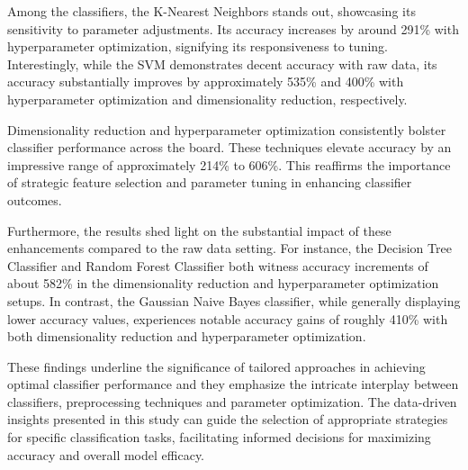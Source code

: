 \documentclass[conference,onecolumn]{IEEEtran}
\begin{document}
    Among the classifiers, the K-Nearest Neighbors stands out, showcasing its sensitivity to parameter adjustments. Its accuracy increases by around 291\% with hyperparameter optimization, signifying its responsiveness to tuning. Interestingly, while the SVM demonstrates decent accuracy with raw data, its accuracy substantially improves by approximately 535\% and 400\% with hyperparameter optimization and dimensionality reduction, respectively.

    Dimensionality reduction and hyperparameter optimization consistently bolster classifier performance across the board. These techniques elevate accuracy by an impressive range of approximately 214\% to 606\%. This reaffirms the importance of strategic feature selection and parameter tuning in enhancing classifier outcomes.

    Furthermore, the results shed light on the substantial impact of these enhancements compared to the raw data setting. For instance, the Decision Tree Classifier and Random Forest Classifier both witness accuracy increments of about 582\% in the dimensionality reduction and hyperparameter optimization setups. In contrast, the Gaussian Naive Bayes classifier, while generally displaying lower accuracy values, experiences notable accuracy gains of roughly 410\% with both dimensionality reduction and hyperparameter optimization.

    These findings underline the significance of tailored approaches in achieving optimal classifier performance and they emphasize the intricate interplay between classifiers, preprocessing techniques and parameter optimization. The data-driven insights presented in this study can guide the selection of appropriate strategies for specific classification tasks, facilitating informed decisions for maximizing accuracy and overall model efficacy.
\end{document}

